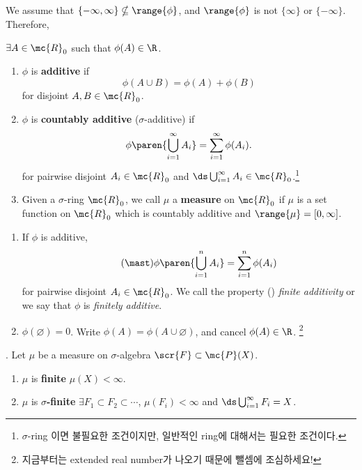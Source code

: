We assume that \(\{-\infty, \infty\} \nsubseteq \range{\phi}\), and \(\range{\phi}\) is not \(\{\infty\}\) or \(\{-\infty\}\). Therefore,
\begin{center}
    \(\exists A \in \mc{R}_0\) such that \(\phi(A) \in \R\).
\end{center}
\begin{enumerate}
    \item \(\phi\) is \textbf{additive} if
          \[
              \phi(A\cup B) = \phi(A) + \phi(B)
          \]
          for disjoint \(A, B \in \mc{R}_0\).

    \item \(\phi\) is \textbf{countably additive} (\(\sigma\)-additive) if
          \[
              \phi\paren{\bigcup_{i=1}^\infty A_i} = \sum_{i=1}^\infty \phi(A_i).
          \]
          for pairwise disjoint \(A_i \in \mc{R}_0\) and \(\ds \bigcup_{i=1}^\infty A_i \in \mc{R}_0\).\footnote{\(\sigma\)-ring 이면 불필요한 조건이지만, 일반적인 ring에 대해서는 필요한 조건이다.}

    \item {} Given a \(\sigma\)-ring \(\mc{R}_0\), we call \(\mu\) a \textbf{measure} on \(\mc{R}_0\) if \(\mu\) is a set function on \(\mc{R}_0\) which is countably additive and \(\range{\mu} = [0, \infty]\).
\end{enumerate}

\medskip

\rmk
\begin{enumerate}
    \item If \(\phi\) is additive,
          \[ \tag{\mast}
              \phi\paren{\bigcup_{i=1}^n A_i} = \sum_{i=1}^n \phi(A_i)
          \]
          for pairwise disjoint \(A_i \in \mc{R}_0\). We call the property (\mast) \textit{finite additivity} or we say that \(\phi\) is \textit{finitely additive}.

    \item \(\phi(\varnothing) = 0\). Write \(\phi(A) = \phi(A \cup \varnothing)\), and cancel \(\phi(A) \in \R\). \footnote{지금부터는 extended real number가 나오기 때문에 뺄셈에 조심하세요!}
\end{enumerate}

\medskip

. Let \(\mu\) be a measure on \(\sigma\)-algebra \(\scr{F} \subset \mc{P}(X)\).
\begin{enumerate}
    \item \(\mu\) is \textbf{finite} \miff \(\mu(X) < \infty\).
    \item \(\mu\) is \textbf{\(\sigma\)-finite} \miff \(\exists F_1 \subset F_2 \subset \cdots\), \(\mu(F_i) < \infty \) and \(\ds \bigcup_{i=1}^\infty F_i = X\).
\end{enumerate}

